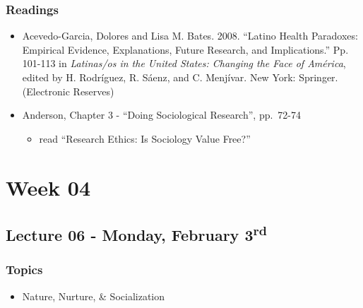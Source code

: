\documentclass[]{book}
\providecommand{\tightlist}{%
  \setlength{\itemsep}{0pt}\setlength{\parskip}{0pt}}
\begin{document}
\hypertarget{readings-5}{%
\subsubsection*{Readings}\label{readings-5}}

\begin{itemize}
\tightlist
\item
  Acevedo-Garcia, Dolores and Lisa M. Bates. 2008. ``Latino Health Paradoxes: Empirical Evidence, Explanations, Future Research, and Implications.'' Pp. 101-113 in \emph{Latinas/os in the United States: Changing the Face of América}, edited by H. Rodríguez, R. Sáenz, and C. Menjívar. New York: Springer. (Electronic Reserves)
\item
  Anderson, Chapter 3 - ``Doing Sociological Research'', pp.~72-74

  \begin{itemize}
  \tightlist
  \item
    read ``Research Ethics: Is Sociology Value Free?''
  \end{itemize}
\end{itemize}

\newpage

\hypertarget{week-04}{%
\section*{Week 04}\label{week-04}}

\hypertarget{lecture-06---monday-february-3rd}{%
\subsection*{\texorpdfstring{Lecture 06 - Monday, February 3\textsuperscript{rd}}{Lecture 06 - Monday, February 3rd}}\label{lecture-06---monday-february-3rd}}

\hypertarget{topics-6}{%
\subsubsection*{Topics}\label{topics-6}}

\begin{itemize}
\tightlist
\item
  Nature, Nurture, \& Socialization
\end{itemize}
\end{document}
